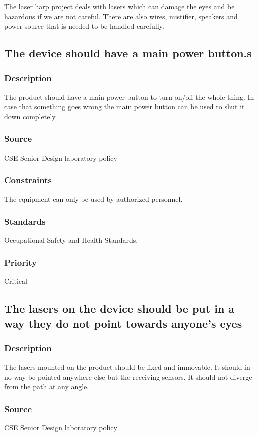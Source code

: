 The laser harp project deals with lasers which can damage the eyes and be hazardous if we are not careful. There are also wires, mistifier, speakers and power source that is needed to be handled carefully.

\subsection{The device should have a main power button.s}
\subsubsection{Description}
The product should have a main power button to turn on/off the whole thing. In case that something goes wrong the main power button can be used to shut it down completely.
\subsubsection{Source}
CSE Senior Design laboratory policy
\subsubsection{Constraints}
The equipment can only be used by authorized personnel.
\subsubsection{Standards}
Occupational Safety and Health Standards.
\subsubsection{Priority}
Critical

\subsection{The lasers on the device should be put in a way they do not point towards anyone’s eyes}
\subsubsection{Description}
The lasers mounted on the product should be fixed and immovable. It should in no way be pointed anywhere else but the receiving sensors. It should not diverge from the path at any angle.
\subsubsection{Source}
CSE Senior Design laboratory policy
